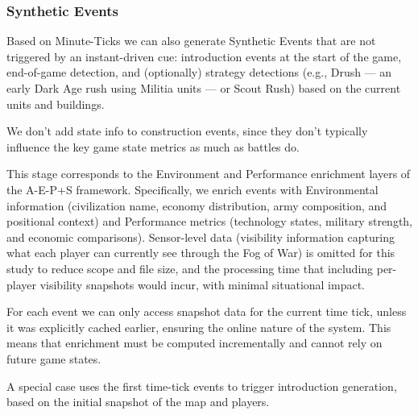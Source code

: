 \subsubsection{Synthetic Events}
Based on Minute-Ticks we can also generate Synthetic Events that are not triggered by an instant-driven cue: introduction events at the start of the game, end-of-game detection, and (optionally) strategy detections (e.g., Drush --- an early Dark Age rush using Militia units --- or Scout Rush) based on the current units and buildings.

We don't add state info to construction events, since they don't typically influence the key game state metrics as much as battles do.

This stage corresponds to the Environment and Performance enrichment layers of the A-E-P+S framework. Specifically, we enrich events with Environmental information (civilization name, economy distribution, army composition, and positional context) and Performance metrics (technology states, military strength, and economic comparisons). Sensor-level data (visibility information capturing what each player can currently see through the Fog of War) is omitted for this study to reduce scope and file size, and the processing time that including per-player visibility snapshots would incur, with minimal situational impact.

For each event we can only access snapshot data for the current time tick, unless it was explicitly cached earlier, ensuring the online nature of the system. This means that enrichment must be computed incrementally and cannot rely on future game states.

A special case uses the first time-tick events to trigger introduction generation, based on the initial snapshot of the map and players.

